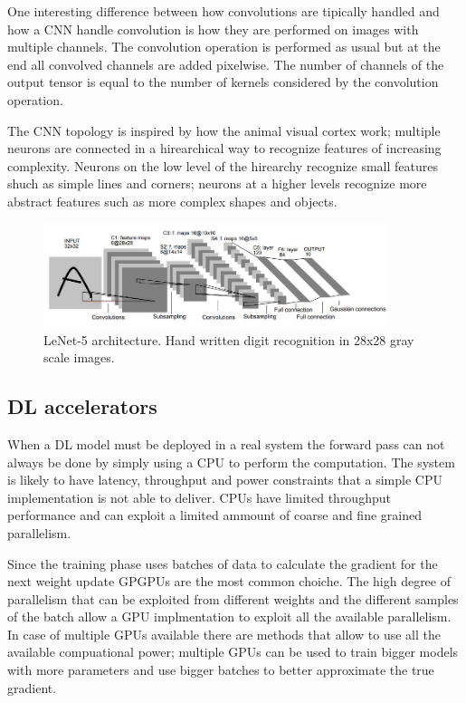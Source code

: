 \documentclass[../main.tex]{subfiles}
\begin{document}
One interesting difference between how convolutions are tipically handled and how a CNN handle convolution is how they are performed on images with multiple channels.
The convolution operation is performed as usual but at the end all convolved channels are added pixelwise.
The number of channels of the output tensor is equal to the number of kernels considered by the convolution operation.

The CNN topology is inspired by how the animal visual cortex work; multiple neurons are connected in a hirearchical way to recognize features of increasing complexity. Neurons on the low level of the hirearchy recognize small features shuch as simple lines and corners; neurons at a higher levels recognize more abstract features such as more complex shapes and objects.

\begin{figure}[h!]
  \includegraphics[width=0.9\textwidth]{images/lenet.jpg}
  \centering
  \caption{LeNet-5 architecture. Hand written digit recognition in 28x28 gray scale images. ~\cite{lenet}}
  \label{fig:lenet}
\end{figure}


\subsection{DL accelerators}

When a DL model must be deployed in a real system the forward pass can not always be done by simply using a CPU to perform the computation. The system is likely to have latency, throughput and power constraints that a simple CPU implementation is not able to deliver. CPUs have limited throughput performance and can exploit a limited ammount of coarse and fine grained parallelism.

Since the training phase uses batches of data to calculate the gradient for the next weight update GPGPUs are the most common choiche.
The high degree of parallelism that can be exploited from different weights and the different samples of the batch allow a GPU implmentation to exploit all the available parallelism.
In case of multiple GPUs available there are methods that allow to use all the available compuational power; multiple GPUs can be used to train bigger models with more parameters and use bigger batches to better approximate the true gradient.
\end{document}
